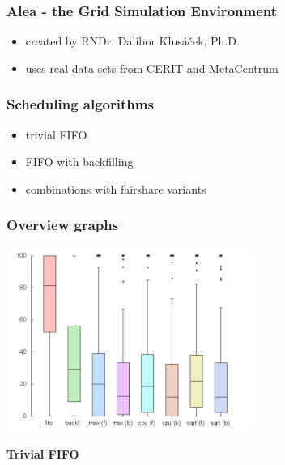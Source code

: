 \begin{frame}
	\frametitle{Alea - the Grid Simulation Environment}
	\begin{itemize}
		\item created by RNDr. Dalibor Klusáček, Ph.D.
		\item uses real data sets from CERIT and MetaCentrum
	\end{itemize}
\end{frame}

\begin{frame}
	\frametitle{Scheduling algorithms}
	\begin{itemize}
		\item trivial FIFO
		\item FIFO with backfilling
		\item combinations with fairshare variants
	\end{itemize}
\end{frame}

\begin{frame}
	\frametitle{Overview graphs}
	\begin{center}
	\includegraphics[width=0.6\textwidth]{perc_deadline.png}
	\end{center}
\end{frame}

{
\begin{frame}[plain]
\begin{minipage}[t][\textheight]{\textwidth}
	\color{white}\textbf{Trivial FIFO}
\end{minipage}
\end{frame}
}

